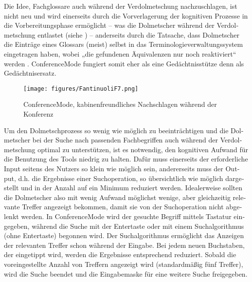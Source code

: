 \documentclass[output=paper]{LSP/langsci}
\begin{document}
\begin{otherlanguage}{ngerman}
Die Idee, Fachglossare auch während der Verdolmetschung nachzuschlagen, ist nicht neu \citep{Stoll2002} und wird einerseits durch die Vorverlagerung der kognitiven Prozesse in die Vorbereitungsphase ermöglicht -- was die Dolmetscher während der Verdolmetschung entlastet (siehe ) -- anderseits durch die Tatsache, dass Dolmetscher die Einträge eines Glossars (meist) selbst in das Terminologieverwaltungssystem eingetragen haben, wobei „die gefundenen Äquivalenzen nur noch reaktiviert“ werden \citep[18]{Drechsel2005}. ConferenceMode fungiert somit eher als eine Gedächtnisstütze denn als Gedächtnisersatz. 

\begin{figure}
\texttt{[image: figures/FantinuoliF7.png]}
\caption{ConferenceMode, kabinenfreundliches Nachschlagen während der Konferenz}
\label{fig:fantinuoli:7}
\end{figure} 

Um den Dolmetschprozess so wenig wie möglich zu beeinträchtigen und die Dolmetscher bei der Suche nach passenden Fachbegriffen auch während der Verdolmetschung optimal zu unterstützen, ist es notwendig, den kognitiven Aufwand für die Benutzung des Tools niedrig zu halten. Dafür muss einerseits der erforderliche Input seitens des Nutzers so klein wie möglich sein, andererseits muss der Output, d.h. die Ergebnisse einer Suchoperation, so übersichtlich wie möglich dargestellt und in der Anzahl auf ein Minimum reduziert werden. Idealerweise sollten die Dolmetscher also mit wenig Aufwand möglichst wenige, aber gleichzeitig relevante Treffer angezeigt bekommen, damit sie von der Suchoperation nicht abgelenkt werden. In ConferenceMode wird der gesuchte Begriff mittels Tastatur eingegeben, während die Suche mit der Entertaste oder mit einem Suchalgorithmus (ohne Entertaste) begonnen wird. Der Suchalgorithmus ermöglicht das Anzeigen der relevanten Treffer schon während der Eingabe. Bei jedem neuen Buchstaben, der eingetippt wird, werden die Ergebnisse entsprechend reduziert. Sobald die voreingestellte Anzahl von Treffern angezeigt wird (standardmäßig fünf Treffer), wird die Suche beendet und die Eingabemaske für eine weitere Suche freigegeben. 


\end{otherlanguage}
\end{document}
